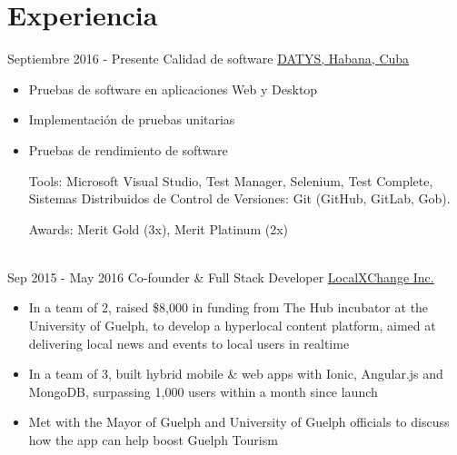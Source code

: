 \documentclass[letterpaper]{twentysecondcv} %
\begin{document}
\makeprofile %
 

\section{Experiencia}

\begin{twenty} %
\twentyitem
    	{Septiembre 2016 -}
		{Presente}
        {Calidad de software}
        {\href{http://datys.cu/}{DATYS, Habana, Cuba}}
        {}
        {\begin{itemize}
        \item Pruebas de software en aplicaciones Web y Desktop
        \item Implementación de pruebas unitarias 
        \item Pruebas de rendimiento de software
        
        Tools: Microsoft Visual Studio, Test Manager, Selenium, Test Complete, Sistemas Distribuidos de Control de Versiones: Git (GitHub, GitLab, Gob).
        
        Awards: Merit Gold (3x), Merit Platinum (2x)
        
        \end{itemize}}
        \\
	\twentyitem
    	{Sep 2015 -}
		{May 2016}
        {Co-founder \& Full Stack Developer}
        {\href{http://www.localxchange.ca/}{LocalXChange Inc.}}
        {}
        {
        {\begin{itemize}
        \item In a team of 2, raised \$8,000 in funding from The Hub incubator at the University of Guelph, to develop a hyperlocal content platform, aimed at delivering local news and events to local users in realtime
        \item In a team of 3, built hybrid mobile \& web apps with Ionic, Angular.js and MongoDB, surpassing 1,000 users within a month since launch
        \item Met with the Mayor of Guelph and University of Guelph officials to discuss how the app can help boost Guelph Tourism 
    \end{itemize}}
        }
        
\end{twenty}
\end{document}
